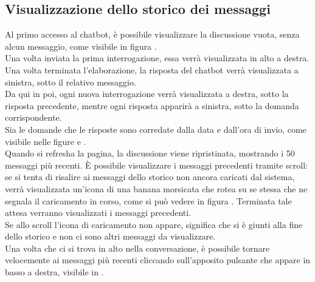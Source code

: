 \newpage


\subsection{Visualizzazione dello storico dei messaggi}
\label{subsec:visualizzazione_storico_messaggi}
Al primo accesso al chatbot, è possibile visualizzare la discussione vuota, senza alcun messaggio, come visibile in figura .\\
Una volta inviata la prima interrogazione, essa verrà visualizzata in alto a destra.
Una volta terminata l'elaborazione, la risposta del chatbot verrà visualizzata a sinistra, sotto il relativo messaggio.\\
Da qui in poi, ogni nuova interrogazione verrà visualizzata a destra, sotto la risposta precedente, mentre ogni risposta apparirà a sinistra, sotto la domanda corrispondente.\\
Sia le domande che le risposte sono corredate dalla data e dall'ora di invio, come visibile nelle figure  e .\\
Quando si refresha la pagina, la discussione viene ripristinata, mostrando i 50 messaggi più recenti. È possibile visualizzare i messaggi precedenti tramite scroll: se si tenta di risalire ai messaggi dello storico non ancora caricati dal sistema, verrà visualizzata un'icona di una banana morsicata che rotea su se stessa che ne segnala il caricamento in corso, come si può vedere in figura . Terminata tale attesa verranno visualizzati i messaggi precedenti.\\
Se allo scroll l'icona di caricamento non appare, significa che si è giunti alla fine dello storico e non ci sono altri messaggi da visualizzare.\\
Una volta che ci si trova in alto nella conversazione, è possibile tornare velocemente ai messaggi più recenti cliccando sull'apposito pulsante che appare in basso a destra, visibile in .

